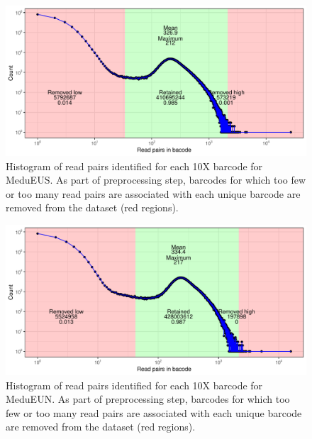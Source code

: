 \documentclass[11pt, a4paper]{article}
\begin{document}
\begin{figure}[h]
	\includegraphics[width=\linewidth]{figures/supfig_MeduEUS_preproc_barcode_filt.pdf}
	\caption{Histogram of read pairs identified for each 10X barcode for MeduEUS.
		As part of preprocessing step, barcodes for which too few or too many read pairs are associated with each unique barcode are removed from the dataset (red regions).}
	\label{supfig:preproc_MeduEUS}
\end{figure}

\begin{figure}[h]
	\includegraphics[width=\linewidth]{figures/supfig_MeduEUN_preproc_barcode_filt.pdf}
	\caption{Histogram of read pairs identified for each 10X barcode for MeduEUN.
	As part of preprocessing step, barcodes for which too few or too many read pairs are associated with each unique barcode are removed from the dataset (red regions).}
	\label{supfig:preproc_MeduEUN}
\end{figure}
\end{document}
